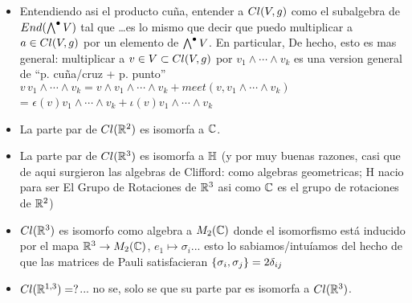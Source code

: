 \begin{frame}
\begin{itemize}
        \item Entendiendo asi el producto cuña, entender a $Cl(V, g)$ como el subalgebra de $End(\bigwedge^\bullet V)$ tal que \dots es lo mismo que decir que puedo multiplicar a $a \in Cl(V, g)$ por un elemento de $\bigwedge^\bullet V$. En particular,  De hecho, esto es mas general: multiplicar a $v \in V \subset Cl(V, g)$ por $v_1 \wedge \cdots \wedge v_k$ es una version general de ``p. cu\~na/cruz + p. punto'' $v \,v_1 \wedge \cdots \wedge v_k = v \wedge v_1 \wedge \cdots \wedge v_k + meet(v, v_1 \wedge \cdots \wedge v_k)$\\ = $\epsilon(v) v_1 \wedge \cdots \wedge v_k + \iota(v) v_1 \wedge \cdots \wedge v_k$
        
        \item La parte par de $Cl(\mathbb R^2)$ es isomorfa a $\mathbb C$.
        
        \item La parte par de $Cl(\mathbb R^3)$ es isomorfa a $\mathbb H$ (y por muy buenas razones, casi que de aqui surgieron las algebras de Clifford: como algebras geometricas; H nacio para ser El Grupo de Rotaciones de $\mathbb R^3$ asi como $\mathbb C$ es el grupo de rotaciones de $\mathbb R^2$)
        
        \item $Cl(\mathbb R^3)$ es isomorfo como algebra a $M_2(\mathbb C)$ donde el isomorfismo está inducido por el mapa $\mathbb R^3 \to M_2(\mathbb C)$, $e_1 \mapsto \sigma_i$... esto lo sabiamos/intuíamos del hecho de que las matrices de Pauli satisfacieran $\{\sigma_i, \sigma_j\} = 2 \delta_{ij}$
        
        \item $Cl(\mathbb R^{1, 3}) = ?$... no se, solo se que su parte par es isomorfa a $Cl(\mathbb R^3)$.
            
        \end{itemize}
\end{frame}
